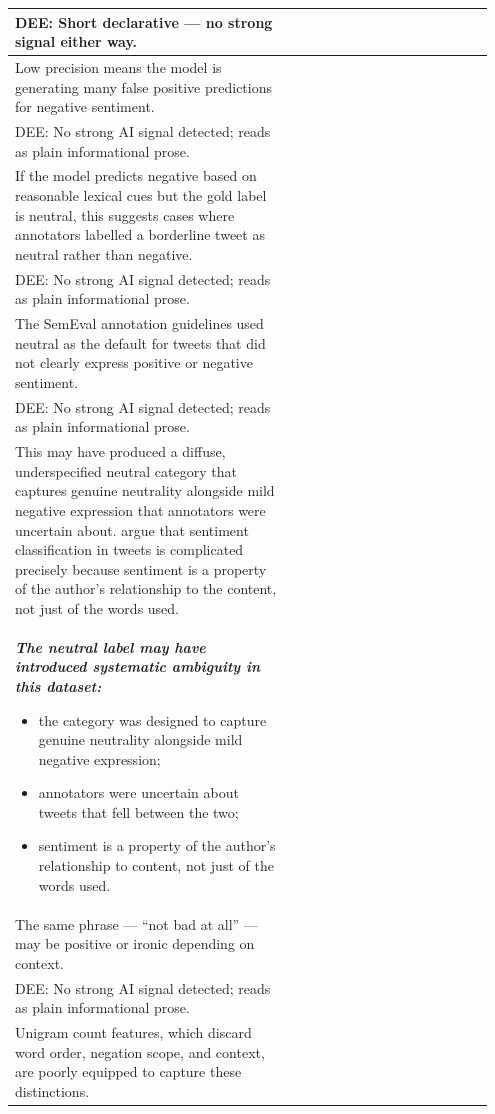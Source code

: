 \documentclass[11pt]{article}
\begin{document}
\begin{longtable}{|p{0.55\linewidth}|p{0.40\linewidth}|}
\hline
DEE: Short declarative --- no strong signal either way. & \\
\hline
Low precision means the model is generating many false positive predictions for negative sentiment. & \\[2pt]
\hline
DEE: No strong AI signal detected; reads as plain informational prose. & \\
\hline
If the model predicts negative based on reasonable lexical cues but the gold label is neutral, this suggests cases where annotators labelled a borderline tweet as neutral rather than negative. & \\[2pt]
\hline
DEE: No strong AI signal detected; reads as plain informational prose. & \\
\hline
The SemEval annotation guidelines used neutral as the default for tweets that did not clearly express positive or negative sentiment. & \\[2pt]
\hline
DEE: No strong AI signal detected; reads as plain informational prose. & \\
\hline
This may have produced a diffuse, underspecified neutral category that captures genuine neutrality alongside mild negative expression that annotators were uncertain about. argue that sentiment classification in tweets is complicated precisely because sentiment is a property of the author's relationship to the content, not just of the words used. & \\[2pt]
\hline
{\bfseries\itshape The neutral label may have introduced systematic ambiguity in this dataset:
\begin{itemize}[leftmargin=*,topsep=2pt,itemsep=1pt,parsep=0pt]
  \item the category was designed to capture genuine neutrality alongside mild negative expression;
  \item annotators were uncertain about tweets that fell between the two;
  \item sentiment is a property of the author's relationship to content, not just of the words used.
\end{itemize}}\vspace{2em} & \\
\hline
The same phrase --- ``not bad at all'' --- may be positive or ironic depending on context. & \\[2pt]
\hline
DEE: No strong AI signal detected; reads as plain informational prose. & \\
\hline
Unigram count features, which discard word order, negation scope, and context, are poorly equipped to capture these distinctions. & \\[2pt]

\end{longtable}
\end{document}
